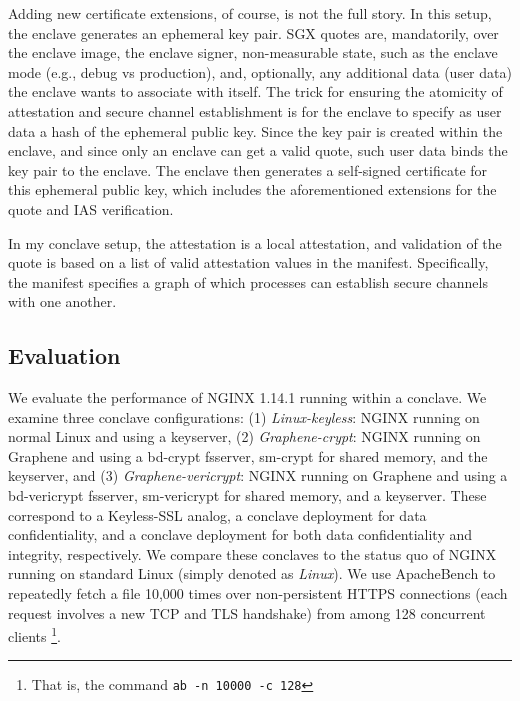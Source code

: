 Adding new certificate extensions, of course, is not the full story.
%
In this setup, the enclave generates an ephemeral key pair.
%
SGX quotes are, mandatorily, over the enclave image, the enclave signer,
non-measurable state, such as the enclave mode (e.g., debug vs production),
and, optionally, any additional data (user data) the enclave wants to
associate with itself.  
%
The trick for ensuring the atomicity of attestation and secure channel
establishment is for the enclave to specify as user data a hash of the ephemeral
public key.
%
Since the key pair is created within the enclave, and since only an enclave can
get a valid quote, such user data binds the key pair to the enclave.
%
The enclave then generates a self-signed certificate for this ephemeral public
key, which includes the aforementioned extensions for the quote and IAS
verification.


In my conclave setup, the attestation is a local attestation, and validation of
the quote is based on a list of valid attestation values in the manifest.
%
Specifically, the manifest specifies a graph of which processes can establish
secure channels with one another.


\subsection{Evaluation}

We evaluate the performance of NGINX 1.14.1 running within a conclave.
%
We examine three conclave configurations: (1) \emph{Linux-keyless}: NGINX
running on normal Linux and using a keyserver, (2) \emph{Graphene-crypt}: NGINX
running on Graphene and using a bd-crypt fsserver, sm-crypt for shared memory,
and the keyserver, and (3) \emph{Graphene-vericrypt}:  NGINX running on
Graphene and using a bd-vericrypt fsserver, sm-vericrypt for shared memory,
and a keyserver.
%
These correspond to a Keyless-SSL analog, a conclave deployment for data
confidentiality, and a conclave deployment for both data confidentiality and
integrity, respectively.  We compare these conclaves to the status quo of NGINX
running on standard Linux (simply denoted as \emph{Linux}).
%
We use ApacheBench to repeatedly fetch a file 10,000 times over non-persistent
HTTPS connections (each request involves a new TCP and TLS handshake) from
among 128 concurrent clients
\footnote{That is, the command \texttt{ab -n 10000 -c 128}}.



